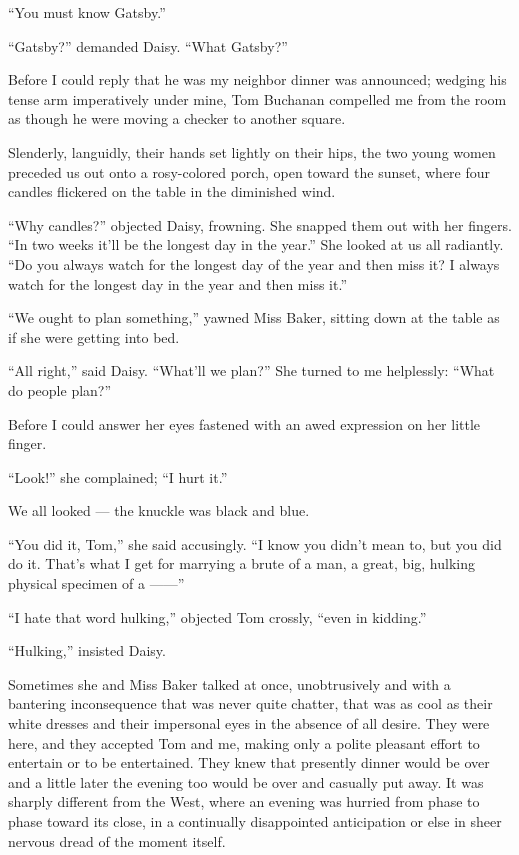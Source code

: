 \documentclass{znotebook}
\begin{document}
``You must know Gatsby.''

``Gatsby?'' demanded Daisy. ``What Gatsby?''

Before I could reply that he was my neighbor dinner was announced; wedging his tense arm imperatively under mine, Tom Buchanan compelled me from the room as though he were moving a checker to another square.

Slenderly, languidly, their hands set lightly on their hips, the two young women preceded us out onto a rosy-colored porch, open toward the sunset, where four candles flickered on the table in the diminished wind.

``Why candles?'' objected Daisy, frowning. She snapped them out with her fingers. ``In two weeks it'll be the longest day in the year.'' She looked at us all radiantly. ``Do you always watch for the longest day of the year and then miss it? I always watch for the longest day in the year and then miss it.''

``We ought to plan something,'' yawned Miss Baker, sitting down at the table as if she were getting into bed.

``All right,'' said Daisy. ``What'll we plan?'' She turned to me helplessly: ``What do people plan?''

Before I could answer her eyes fastened with an awed expression on her little finger.

``Look!'' she complained; ``I hurt it.''

We all looked — the knuckle was black and blue.

``You did it, Tom,'' she said accusingly. ``I know you didn't mean to, but you did do it. That's what I get for marrying a brute of a man, a great, big, hulking physical specimen of a ——''

``I hate that word hulking,'' objected Tom crossly, ``even in kidding.''

``Hulking,'' insisted Daisy.

Sometimes she and Miss Baker talked at once, unobtrusively and with a bantering inconsequence that was never quite chatter, that was as cool as their white dresses and their impersonal eyes in the absence of all desire. They were here, and they accepted Tom and me, making only a polite pleasant effort to entertain or to be entertained. They knew that presently dinner would be over and a little later the evening too would be over and casually put away. It was sharply different from the West, where an evening was hurried from phase to phase toward its close, in a continually disappointed anticipation or else in sheer nervous dread of the moment itself.
\end{document}
